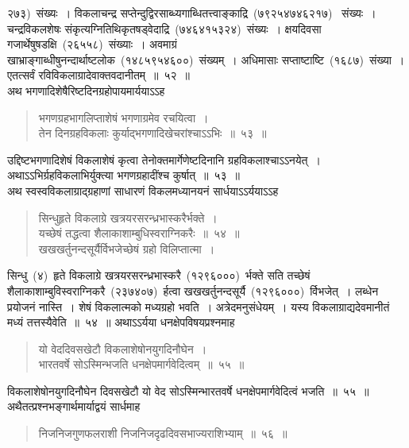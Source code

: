 \documentclass[11pt, openany]{book}
\begin{document}
\newpage
\thispagestyle{fancy}
\fancyhf{}
\noindent
२७३)~संख्यः~। विकलाचन्द्र सप्तेन्दुद्विरसाब्ध्यगाब्धितत्त्वाङ्काद्रि~(७९२५४७४६२१७)~
संख्यः~। चन्द्रविकलशेषः संकृत्यग्नितिथिकृतषड्वेदाद्रि~(७४६४१५३२४)~संख्यः~। क्षयदिवसा गजार्थेषुषडक्षि~(२६५५८)~संख्याः~। अवमाग्रं खाभ्राङ्गाब्धीषुनन्दार्थाष्टलोक~(१४८५९५४६००)~संख्यम्~। अधिमासाः सप्ताष्टाष्टि~(१६८७)~संख्या~। एतत्सर्वं रविविकलाग्रादेवाक्तवदानीतम्~॥~५२~॥\\
\indent
अथ भगणादिशेषैरिष्टदिनग्रहोपायमार्ययाऽऽह \textendash
\begin{quote}
{\ks भगणग्रहभागलिप्ताशेषं भगणाग्रमेव रचयित्वा~।\\
तेन दिनग्रहविकलाः कुर्याद्भगणादिखेचरांश्चाऽऽभिः~॥~५३~॥}
\end{quote}
\indent
उद्दिष्टभगणादिशेषं विकलाशेषं कृत्वा तेनोक्तमार्गेणेष्टदिनानि ग्रहविकलाश्चाऽऽनयेत्~। अथाऽऽभिर्ग्रहविकलाभिर्युक्त्या भगणग्रहादींश्च कुर्षात्~॥~५३~॥\\
\indent
अथ स्वस्वविकलाग्राद्ग्रहाणां साधारणं विकलमध्यानयनं सार्धयाऽऽर्ययाऽऽह\textendash
\begin{quote}
{\ks सिन्धुहृते विकलाग्रे खत्रयरसरन्ध्रभास्करैर्भक्ते~।\\
यच्छेषं तद्धत्वा शैलाकाशाम्बुधिस्वराग्निकरैः~॥~५४~॥\\
खखखर्तुनन्दसूर्यैर्विभजेच्छेषं ग्रहो विलिप्तात्मा~।}
\end{quote}
\indent
सिन्धु~(४)~हृते विकलाग्रे खत्रयरसरन्ध्रभास्करै~(१२९६०००)~र्भक्ते सति तच्छेषं शैलाकाशाम्बुविस्वराग्निकरै~(२३७४०७)~र्हत्वा खखखर्तुनन्दसूर्यै~(१२९६०००)~र्विभजेत्~। लब्धेन प्रयोजनं नास्ति~। शेषं विकलात्मको मध्यग्रहो भवति~। अत्रेदमनुसंधेयम्~। यस्य विकलाग्राद्यदेवमानीतं मध्यं तत्तस्यैवेति~॥~५४~॥
\indent
अथाऽऽर्यया धनक्षेपविषयप्रश्नमाह\textendash
\begin{quote}
{\ks यो वेददिवसखेटौ विकलाशेषोनयुगदिनौघेन~।\\
भारतवर्षे सोऽस्मिन्भजति धनक्षेपमार्गवेदित्वम्~॥~५५~॥}
\end{quote}
\indent
विकलाशेषोनयुगदिनौघेन दिवसखेटौ यो वेद सोऽस्मिन्भारतवर्षे धनक्षेपमार्गवेदित्वं भजति~॥~५५~॥\\
\indent
अथैतत्प्रश्नभङ्गार्थमार्याद्वयं सार्धमाह\textendash
\begin{quote}
{\ks निजनिजगुणफलराशी निजनिजदृढदिवसभाज्यराशिभ्याम्~॥~५६~॥}
\end{quote}
\end{document}
